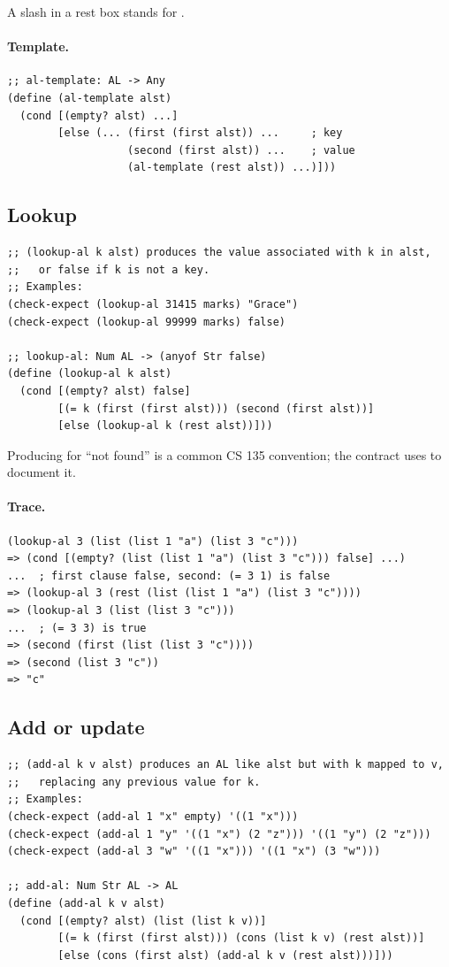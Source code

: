 A slash in a rest box stands for .

\paragraph{Template.}
\begin{lstlisting}[style=racket]
;; al-template: AL -> Any
(define (al-template alst)
  (cond [(empty? alst) ...]
        [else (... (first (first alst)) ...     ; key
                   (second (first alst)) ...    ; value
                   (al-template (rest alst)) ...)]))
\end{lstlisting}

\subsection{Lookup}
\begin{lstlisting}[style=racket]
;; (lookup-al k alst) produces the value associated with k in alst,
;;   or false if k is not a key.
;; Examples:
(check-expect (lookup-al 31415 marks) "Grace")
(check-expect (lookup-al 99999 marks) false)

;; lookup-al: Num AL -> (anyof Str false)
(define (lookup-al k alst)
  (cond [(empty? alst) false]
        [(= k (first (first alst))) (second (first alst))]
        [else (lookup-al k (rest alst))]))
\end{lstlisting}
Producing  for ``not found'' is a common CS 135 convention; the
contract uses  to document it.

\paragraph{Trace.}
\begin{lstlisting}[style=racket]
(lookup-al 3 (list (list 1 "a") (list 3 "c")))
=> (cond [(empty? (list (list 1 "a") (list 3 "c"))) false] ...)
...  ; first clause false, second: (= 3 1) is false
=> (lookup-al 3 (rest (list (list 1 "a") (list 3 "c"))))
=> (lookup-al 3 (list (list 3 "c")))
...  ; (= 3 3) is true
=> (second (first (list (list 3 "c"))))
=> (second (list 3 "c"))
=> "c"
\end{lstlisting}

\subsection{Add or update}
\begin{lstlisting}[style=racket]
;; (add-al k v alst) produces an AL like alst but with k mapped to v,
;;   replacing any previous value for k.
;; Examples:
(check-expect (add-al 1 "x" empty) '((1 "x")))
(check-expect (add-al 1 "y" '((1 "x") (2 "z"))) '((1 "y") (2 "z")))
(check-expect (add-al 3 "w" '((1 "x"))) '((1 "x") (3 "w")))

;; add-al: Num Str AL -> AL
(define (add-al k v alst)
  (cond [(empty? alst) (list (list k v))]
        [(= k (first (first alst))) (cons (list k v) (rest alst))]
        [else (cons (first alst) (add-al k v (rest alst)))]))
\end{lstlisting}

